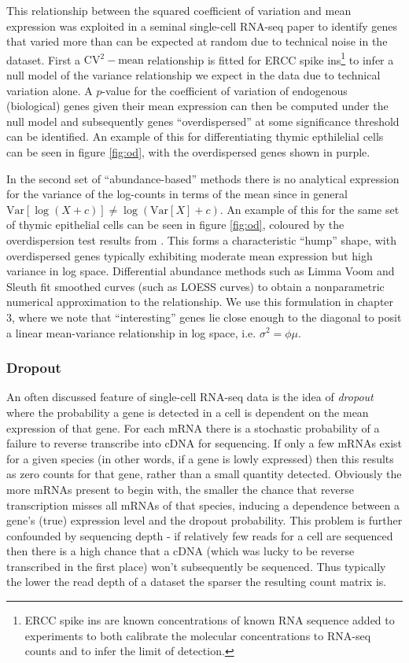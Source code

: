 This relationship between the squared coefficient of variation and mean expression was exploited in a seminal single-cell RNA-seq paper \cite{Brennecke2013-xy} to identify genes that varied more than can be expected at random due to technical noise in the dataset. First a $\text{CV}^2-\text{mean}$ relationship is fitted for ERCC spike ins\footnote{
ERCC spike ins are known concentrations of known RNA sequence added to experiments to both calibrate the molecular concentrations to RNA-seq counts and to infer the limit of detection.
} to infer a null model of the variance relationship we expect in the data due to technical variation alone. A $p$-value for the coefficient of variation of endogenous (biological) genes given their mean expression can then be computed under the null model and subsequently genes ``overdispersed'' at some significance threshold can be identified. An example of this for differentiating thymic epthilelial cells can be seen in figure \ref{fig:od}, with the overdispersed genes shown in purple.

In the second set of ``abundance-based'' methods there is no analytical expression for the variance of the log-counts in terms of the mean since in general $\text{Var}[\log(X + c)] \neq \log(\text{Var}[X] + c)$. An example of this for the same set of thymic epithelial cells can be seen in figure \ref{fig:od}, coloured by the overdispersion test results from \cite{Brennecke2013-xy}. This forms a characteristic ``hump'' shape, with overdispersed genes typically exhibiting moderate mean expression but high variance in log space. Differential abundance methods such as Limma Voom and Sleuth fit smoothed curves (such as LOESS curves) to obtain a nonparametric numerical approximation to the relationship. We use this formulation in chapter 3, where we note that ``interesting'' genes lie close enough to the diagonal to posit a linear mean-variance relationship in log space, i.e. $\sigma^2 = \phi \mu$.

\subsubsection{Dropout} \label{sec:intro_dropout}

An often discussed feature of single-cell RNA-seq data is the idea of \emph{dropout} where the probability a gene is detected in a cell is dependent on the mean expression of that gene. For each mRNA there is a stochastic probability of a failure to reverse transcribe into cDNA for sequencing. If only a few mRNAs exist for a given species (in other words, if a gene is lowly expressed) then this results as zero counts for that gene, rather than a small quantity detected. Obviously the more mRNAs present to begin with, the smaller the chance that reverse transcription misses all mRNAs of that species, inducing a dependence between a gene's (true) expression level and the dropout probability. This problem is further confounded by sequencing depth - if relatively few reads for a cell are sequenced then there is a high chance that a cDNA (which was lucky to be reverse transcribed in the first place) won't subsequently be sequenced. Thus typically the lower the read depth of a dataset the sparser the resulting count matrix is.

